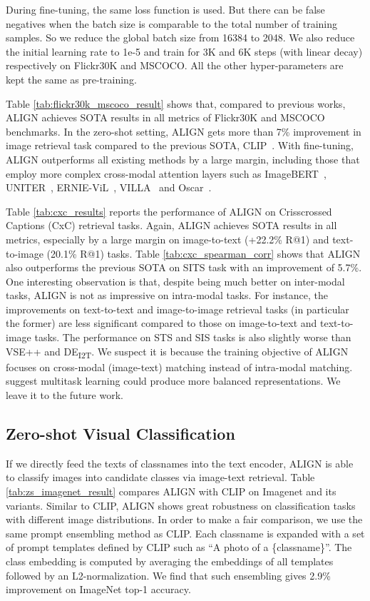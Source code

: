 \documentclass{article}
\begin{document}
During fine-tuning, the same loss function is used. But there can be false negatives when the batch size is comparable to the total number of training samples. So we reduce the global batch size from 16384 to 2048. We also reduce the initial learning rate to 1e-5 and train for 3K and 6K steps (with linear decay) respectively on Flickr30K and MSCOCO. All the other hyper-parameters are kept the same as pre-training.

Table \ref{tab:flickr30k_mscoco_result} shows that, compared to previous works, ALIGN achieves SOTA results in all metrics of Flickr30K and MSCOCO benchmarks. In the zero-shot setting, ALIGN gets more than 7\% improvement in image retrieval task compared to the previous SOTA, CLIP~\cite{radford:clip}. With fine-tuning, ALIGN outperforms all existing methods by a large margin, including those that employ more complex cross-modal attention layers such as ImageBERT~\cite{qi:imagebert}, UNITER~\cite{chen:uniter}, ERNIE-ViL~\cite{yu:ernie-vil}, VILLA~\cite{gan:villa} and Oscar~\cite{li:oscar}.


Table \ref{tab:cxc_results} reports the performance of ALIGN on Crisscrossed Captions (CxC) retrieval tasks. Again, ALIGN achieves  SOTA results in all metrics, especially by a large margin on image-to-text (+22.2\% R@1) and text-to-image (20.1\% R@1) tasks.
Table \ref{tab:cxc_spearman_corr} shows that ALIGN also outperforms the previous SOTA on SITS task with an improvement of 5.7\%.
One interesting observation is that, despite being much better on inter-modal tasks, ALIGN is not as impressive on intra-modal tasks.
For instance, the improvements on text-to-text and image-to-image retrieval tasks (in particular the former) are less significant compared to those on image-to-text and text-to-image tasks.
The performance on STS and SIS tasks is also slightly worse than VSE++ and DE\textsubscript{I2T}. 
We suspect it is because the training objective of ALIGN focuses on cross-modal (image-text) matching instead of intra-modal matching.
\citet{parekh:cxc} suggest multitask learning could produce more balanced representations.
We leave it to the future work.

\vspace{-2mm}

\subsection{Zero-shot Visual Classification}

If we directly feed the texts of classnames into the text encoder, ALIGN is able to classify images into candidate classes via image-text retrieval. Table \ref{tab:zs_imagenet_result} compares ALIGN with CLIP on Imagenet and its variants. Similar to CLIP, ALIGN shows great robustness on classification tasks with different image distributions. In order to make a fair comparison, we use the same prompt ensembling method as CLIP. Each classname is expanded with a set of prompt templates defined by CLIP such as ``A photo of a \{classname\}''. The class embedding is computed by averaging the embeddings of all templates followed by an L2-normalization. We find that such ensembling gives 2.9\% improvement on ImageNet top-1 accuracy.
\end{document}
